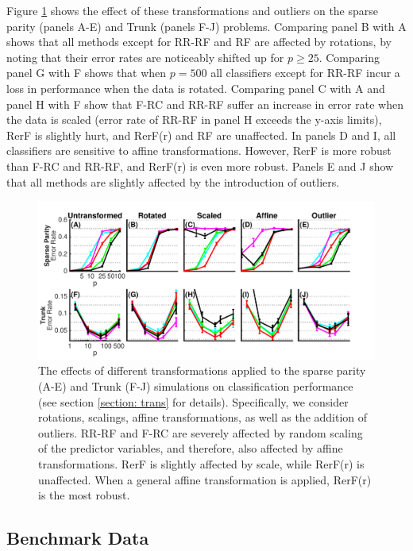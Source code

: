 \documentclass{article}
\begin{document}
Figure \ref{transformations} shows the effect of these transformations and outliers on the sparse parity (panels A-E) and Trunk (panels F-J) problems. Comparing panel B with A shows that all methods except for RR-RF and RF are affected by rotations, by noting that their error rates are noticeably shifted up for $p \geq 25$. Comparing panel G with F shows that when $p = 500$ all classifiers except for RR-RF incur a loss in performance when the data is rotated. Comparing panel C with A and panel H with F show that F-RC and RR-RF suffer an increase in error rate when the data is  scaled (error rate of RR-RF in panel H exceeds the y-axis limits), RerF is slightly hurt, and RerF(r) and RF are unaffected. In panels D and I, all classifiers are sensitive to affine transformations. However, RerF is more robust than F-RC and RR-RF, and RerF(r) is even more robust. Panels E and J show that all methods are slightly affected by the introduction of outliers. 

\begin{figure}[ht]
\vskip 0.2in
\begin{center}
\centerline{\includegraphics[width=\columnwidth]{Fig3_transformations2}}
\caption{The effects of different transformations applied to the sparse parity (A-E) and Trunk (F-J) simulations on classification performance (see section \ref{section: trans} for details). Specifically, we consider rotations, scalings, affine transformations, as well as the addition of outliers. RR-RF and F-RC are severely affected by random scaling of the predictor variables, and therefore, also affected by affine transformations. RerF is slightly affected by scale, while RerF(r) is unaffected. When a general affine transformation is applied, RerF(r) is the most robust.}
\label{transformations}
\end{center}
\vskip -0.2in
\end{figure}

\subsection{Benchmark Data}
\label{section: benchmark}
\end{document}
